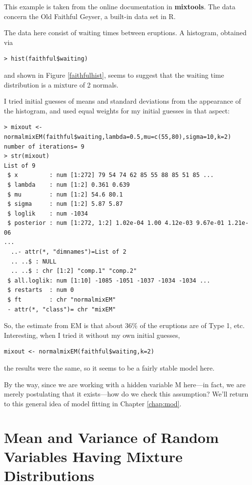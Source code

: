 This example is taken from the online documentation in {\bf mixtools}.
The data concern the Old Faithful Geyser, a built-in data set in R.

The data here consist of waiting times between eruptions.  A histogram,
obtained via 

\begin{lstlisting}
> hist(faithful$waiting)
\end{lstlisting}

and shown in Figure \ref{faithfulhist}, seems to suggest that the
waiting time distribution is a mixture of 2 normals. 

I tried initial guesses of means and standard deviations from the
appearance of the histogram, and used equal weights for my initial
guesses in that aspect:

\begin{lstlisting}
> mixout <- normalmixEM(faithful$waiting,lambda=0.5,mu=c(55,80),sigma=10,k=2)
number of iterations= 9 
> str(mixout)
List of 9
 $ x         : num [1:272] 79 54 74 62 85 55 88 85 51 85 ...
 $ lambda    : num [1:2] 0.361 0.639
 $ mu        : num [1:2] 54.6 80.1
 $ sigma     : num [1:2] 5.87 5.87
 $ loglik    : num -1034
 $ posterior : num [1:272, 1:2] 1.02e-04 1.00 4.12e-03 9.67e-01 1.21e-06
...
  ..- attr(*, "dimnames")=List of 2
  .. ..$ : NULL
  .. ..$ : chr [1:2] "comp.1" "comp.2"
 $ all.loglik: num [1:10] -1085 -1051 -1037 -1034 -1034 ...
 $ restarts  : num 0
 $ ft        : chr "normalmixEM"
 - attr(*, "class")= chr "mixEM"
\end{lstlisting}

So, the estimate from EM is that about 36\% of the eruptions are of Type
1, etc.  Interesting, when I tried it without my own initial guesses,

\begin{lstlisting}
mixout <- normalmixEM(faithful$waiting,k=2)
\end{lstlisting}

the results were the same, so it seems to be a fairly stable model here.

By the way, since we are working with a hidden variable M here---in
fact, we are merely postulating that it exists---how do we check this
assumption?  We'll return to this general idea of model fitting in
Chapter \ref{chap:mod}.

\section{Mean and Variance of Random Variables Having Mixture
Distributions}
\label{mixmeanvar}

